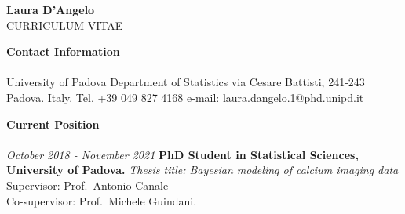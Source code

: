 \documentclass[10pt]{amsart}
\begin{document}
 \thispagestyle{empty}

	\begin{center}
	{\LARGE {\bf Laura D'Angelo}} \\[.5pc]
	CURRICULUM VITAE
	\end{center}

	\bigskip 


	{\large {\bf Contact Information}} \\[-.08cm] 
	\underline{\hspace{6in}} \\[.2cm] 
	   University of Padova\newline
	Department of Statistics\newline
	via Cesare Battisti, 241-243 Padova. Italy. \newline
	\newline
	Tel. +39 049 827 4168\newline
	e-mail: laura.dangelo.1@phd.unipd.it
	\newline\newline

	{\large {\bf Current Position}} \\[-.08cm] 
	\underline{\hspace{6in}} \\[.2cm] 
		{\it October 2018 - November 2021}\newline
	{\bf PhD Student in Statistical Sciences,  University of Padova. 
	} 
	\newline 
	{\it Thesis title: Bayesian modeling of calcium imaging data }\\
	Supervisor: Prof.\ Antonio Canale\\
	Co-supervisor: Prof.\ Michele Guindani. 
	\newline 
\end{document}
